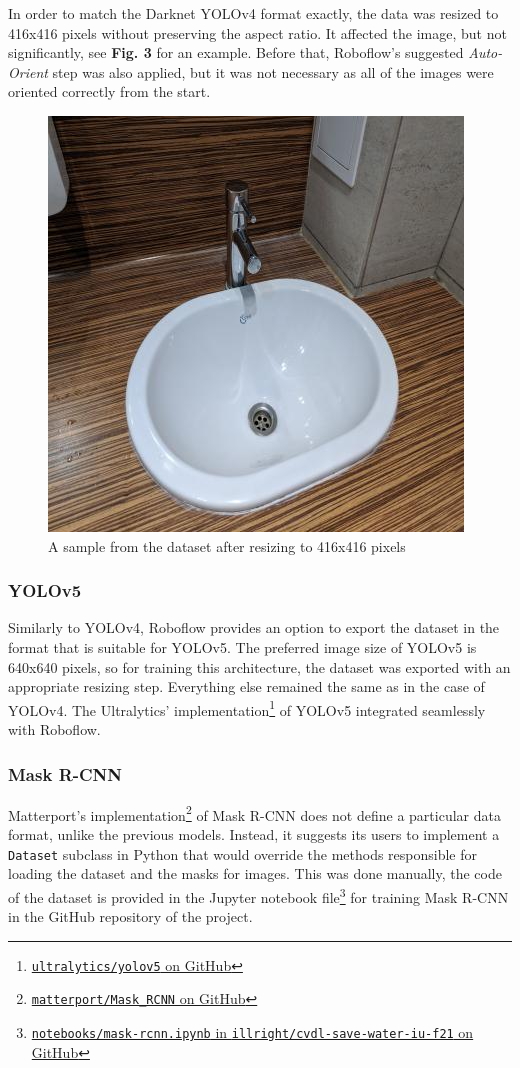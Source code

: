 \documentclass[journal,onecolumn]{IEEEtran}
\begin{document}
In order to match the Darknet YOLOv4 format exactly, the data was resized to 416x416 pixels without preserving the aspect ratio. It affected the image, but not significantly, see \textbf{Fig. 3} for an example. Before that, Roboflow's suggested \emph{Auto-Orient} step was also applied, but it was not necessary as all of the images were oriented correctly from the start.

\begin{figure}
    \centering
    \includegraphics[width=0.475\linewidth]{figures/sample-416.jpg}
    \caption{A sample from the dataset after resizing to 416x416 pixels}
\end{figure}

\subsubsection{YOLOv5}

Similarly to YOLOv4, Roboflow provides an option to export the dataset in the format that is suitable for YOLOv5. The preferred image size of YOLOv5 is 640x640 pixels, so for training this architecture, the dataset was exported with an appropriate resizing step. Everything else remained the same as in the case of YOLOv4. The Ultralytics' implementation\footnote{\href{https://github.com/ultralytics/yolov5}{\texttt{ultralytics/yolov5} on GitHub}} of YOLOv5 integrated seamlessly with Roboflow.

\subsubsection{Mask R-CNN}

Matterport's implementation\footnote{\href{https://github.com/matterport/Mask_RCNN}{\texttt{matterport/Mask\_RCNN} on GitHub}} of Mask R-CNN does not define a particular data format, unlike the previous models. Instead, it suggests its users to implement a \texttt{Dataset} subclass in Python that would override the methods responsible for loading the dataset and the masks for images. This was done manually, the code of the dataset is provided in the Jupyter notebook file\footnote{\href{https://github.com/illright/cvdl-save-water-iu-f21/blob/main/notebooks/mask-rcnn.ipynb}{\texttt{notebooks/mask-rcnn.ipynb} in \texttt{illright/cvdl-save-water-iu-f21} on GitHub}} for training Mask R-CNN in the GitHub repository of the project.
\end{document}
